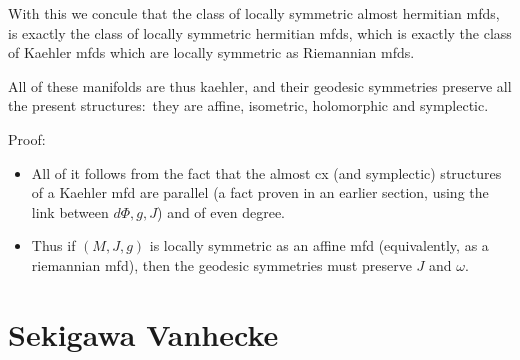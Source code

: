 \documentclass{report}
\theoremstyle{definition}
\begin{document}
\begin{itemize}
    With this we concule that the class of locally symmetric almost hermitian mfds, is exactly the class of locally symmetric hermitian mfds, which is exactly the class of Kaehler mfds which are locally symmetric as Riemannian mfds.

    All of these manifolds are thus kaehler, and their geodesic symmetries preserve all the present structures: they are affine, isometric, holomorphic and symplectic.

    Proof:
    \begin{itemize}
        \item All of it follows from the fact that the almost cx (and symplectic) structures of a Kaehler mfd are parallel (a fact proven in an earlier section, using the link between $d\Phi,g,J$) and of even degree.
        \item Thus if $(M,J,g)$ is locally symmetric as an affine mfd (equivalently, as a riemannian mfd), then the geodesic symmetries must preserve $J$ and $\omega$.
    \end{itemize}
\end{itemize}

\chapter{Sekigawa Vanhecke}
\end{document}
